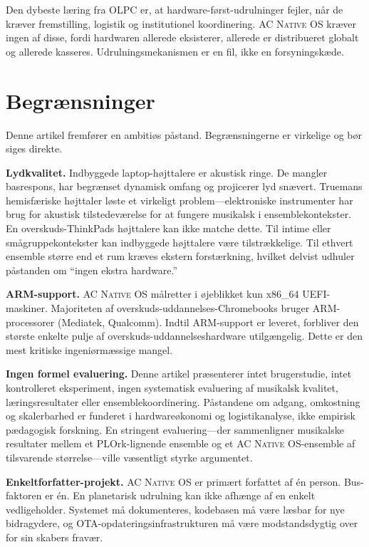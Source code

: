 \documentclass[10pt,letterpaper,twocolumn]{article}
\newcommand{\acos}{\textsc{AC Native OS}}
\begin{document}
Den dybeste l{\ae}ring fra OLPC er, at hardware-f{\o}rst-udrulninger fejler, n{\aa}r de kr{\ae}ver fremstilling, logistik og institutionel koordinering. \acos{} kr{\ae}ver ingen af disse, fordi hardwaren allerede eksisterer, allerede er distribueret globalt og allerede kasseres. Udrulningsmekanismen er en fil, ikke en forsyningsk{\ae}de.


\section{Begr{\ae}nsninger}
\label{sec:limitations}

Denne artikel fremf{\o}rer en ambiti{\o}s p{\aa}stand. Begr{\ae}nsningerne er virkelige og b{\o}r siges direkte.

\textbf{Lydkvalitet.} Indbyggede laptop-h{\o}jttalere er akustisk ringe. De mangler basrespons, har begr{\ae}nset dynamisk omfang og projicerer lyd snævert. Truemans hemisf{\ae}riske h{\o}jttaler l{\o}ste et virkeligt problem---elektroniske instrumenter har brug for akustisk tilstedev{\ae}relse for at fungere musikalsk i ensemblekontekster. En overskuds-ThinkPads h{\o}jttalere kan ikke matche dette. Til intime eller sm{\aa}gruppekontekster kan indbyggede h{\o}jttalere v{\ae}re tilstr{\ae}kkelige. Til ethvert ensemble st{\o}rre end et rum kr{\ae}ves ekstern forst{\ae}rkning, hvilket delvist udhuler p{\aa}standen om ``ingen ekstra hardware.''

\textbf{ARM-support.} \acos{} m{\aa}lretter i {\o}jeblikket kun x86\_64 UEFI-maskiner. Majoriteten af overskuds-uddannelses-Chromebooks bruger ARM-processorer (Mediatek, Qualcomm). Indtil ARM-support er leveret, forbliver den st{\o}rste enkelte pulje af overskuds-uddannelseshardware utilg{\ae}ngelig. Dette er den mest kritiske ingeni{\o}rm{\ae}ssige mangel.

\textbf{Ingen formel evaluering.} Denne artikel pr{\ae}senterer intet brugerstudie, intet kontrolleret eksperiment, ingen systematisk evaluering af musikalsk kvalitet, l{\ae}ringsresultater eller ensemblekoordinering. P{\aa}standene om adgang, omkostning og skalerbarhed er funderet i hardware{\o}konomi og logistikanalyse, ikke empirisk p{\ae}dagogisk forskning. En stringent evaluering---der sammenligner musikalske resultater mellem et PLOrk-lignende ensemble og et \acos{}-ensemble af tilsvarende st{\o}rrelse---ville v{\ae}sentligt styrke argumentet.

\textbf{Enkeltforfatter-projekt.} \acos{} er prim{\ae}rt forfattet af \'{e}n person. Bus-faktoren er \'{e}n. En planetarisk udrulning kan ikke afh{\ae}nge af en enkelt vedligeholder. Systemet m{\aa} dokumenteres, kodebasen m{\aa} v{\ae}re l{\ae}sbar for nye bidragydere, og OTA-opdateringsinfrastrukturen m{\aa} v{\ae}re modstandsdygtig over for sin skabers frav{\ae}r.
\end{document}

